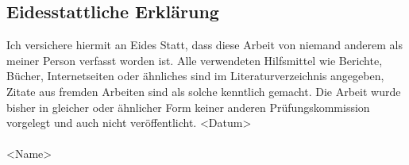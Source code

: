 \subsection*{Eidesstattliche Erklärung}

Ich versichere hiermit an Eides Statt, dass diese Arbeit von niemand anderem als meiner Person verfasst worden ist. Alle verwendeten Hilfsmittel wie Berichte, Bücher, Internetseiten oder ähnliches sind im Literaturverzeichnis angegeben, Zitate aus fremden Arbeiten sind als solche kenntlich gemacht. Die Arbeit wurde bisher in gleicher oder ähnlicher Form keiner anderen Prüfungskommission vorgelegt und auch nicht veröffentlicht.
\parbig
<Datum> \\\\
<Name>
